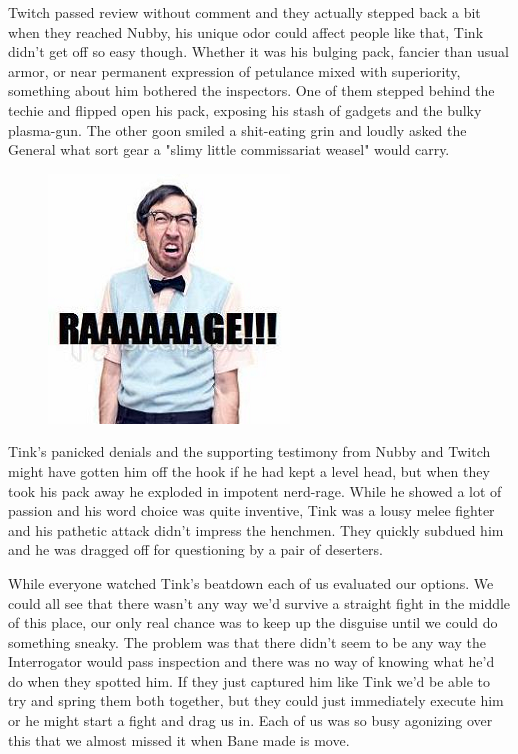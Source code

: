 Twitch passed review without comment and they actually stepped back a bit when they reached Nubby, his unique odor could affect people like that, Tink didn't get off so easy though. 
Whether it was his bulging pack, fancier than usual armor, or near permanent expression of petulance mixed with superiority, something about him bothered the inspectors. 
One of them stepped behind the techie and flipped open his pack, exposing his stash of gadgets and the bulky plasma-gun. 
The other goon smiled a shit-eating grin and loudly asked the General what sort gear a "slimy little commissariat weasel" would carry.

\begin{figure}
	\begin{center}
		\includegraphics[width=\figwidth]{pics/9/28.png}
	\end{center}
\end{figure}
Tink's panicked denials and the supporting testimony from Nubby and Twitch might have gotten him off the hook if he had kept a level head, but when they took his pack away he exploded in impotent nerd-rage. 
While he showed a lot of passion and his word choice was quite inventive, Tink was a lousy melee fighter and his pathetic attack didn't impress the henchmen. 
They quickly subdued him and he was dragged off for questioning by a pair of deserters.

While everyone watched Tink's beatdown each of us evaluated our options. 
We could all see that there wasn't any way we'd survive a straight fight in the middle of this place, our only real chance was to keep up the disguise until we could do something sneaky. 
The problem was that there didn't seem to be any way the Interrogator would pass inspection and there was no way of knowing what he'd do when they spotted him. 
If they just captured him like Tink we'd be able to try and spring them both together, but they could just immediately execute him or he might start a fight and drag us in. 
Each of us was so busy agonizing over this that we almost missed it when Bane made is move.

